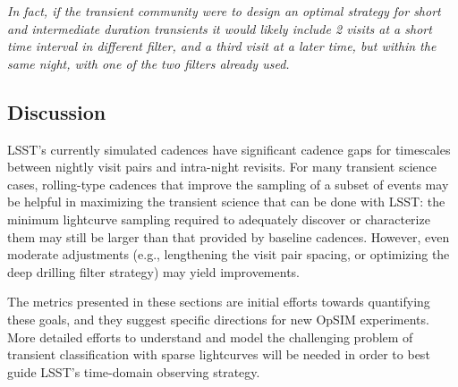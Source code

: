 \emph{In fact, if the transient community were to design an optimal strategy for short and intermediate duration transients it would likely include 2 visits at a short time interval in different filter, and a third visit at a later time, but within the same night, with one of the two filters already used.}




\subsection{Discussion}
\label{sec:\chpname:discussion}

LSST's currently simulated cadences have significant cadence gaps for
timescales between nightly visit pairs and intra-night revisits.  For
many transient science cases, rolling-type cadences that improve the
sampling of a subset of events may be helpful in maximizing the
transient science that can be done with LSST: the minimum lightcurve
sampling required to adequately discover or characterize them may
still be larger than that provided by baseline cadences.  However,
even moderate adjustments (e.g., lengthening the visit pair spacing,
or optimizing the deep drilling filter strategy) may yield
improvements.


The metrics presented in these sections are initial efforts towards
quantifying these goals, and they suggest specific directions for new
OpSIM experiments.  More detailed efforts to understand and model the
challenging problem of transient classification with sparse
lightcurves will be needed in order to best guide LSST's time-domain
observing strategy.












% 

